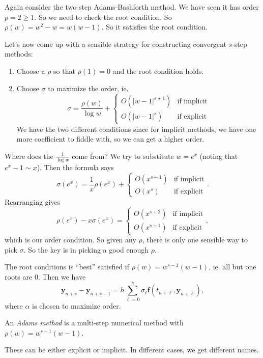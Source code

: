 \documentclass[a4paper]{article}
\begin{document}
\begin{eg}[AB2]
  Again consider the two-step Adams-Bashforth method. We have seen it has order $p = 2 \geq 1$. So we need to check the root condition. So $\rho(w) = w^2 - w = w(w - 1)$. So it satisfies the root condition.
\end{eg}

Let's now come up with a sensible strategy for constructing convergent $s$-step methods:
\begin{enumerate}
  \item Choose a $\rho$ so that $\rho(1) = 0$ and the root condition holds.
  \item Choose $\sigma$ to maximize the order, ie.
    \[
      \sigma = \frac{\rho(w)}{\log w} +
      \begin{cases}
        O(|w - 1|^{s + 1}) & \text{if implicit}\\
        O(|w - 1|^s) & \text{if explicit}
      \end{cases}
    \]
    We have the two different conditions since for implicit methods, we have one more coefficient to fiddle with, so we can get a higher order.
\end{enumerate}
Where does the $\frac{1}{\log w}$ come from? We try to substitute $w = e^x$ (noting that $e^x - 1\sim x$). Then the formula says
\[
  \sigma(e^x) = \frac{1}{x} \rho(e^x) +
  \begin{cases}
    O(x^{s + 1}) & \text{if implicit}\\
    O(x^s) & \text{if explicit}
  \end{cases}.
\]
Rearranging gives
\[
  \rho(e^x) -x \sigma (e^x) =
  \begin{cases}
    O(x^{s + 2}) & \text{if implicit}\\
    O(x^{s + 1}) & \text{if explicit}
  \end{cases},
\]
which is our order condition. So given any $\rho$, there is only one sensible way to pick $\sigma$. So the key is in picking a good enough $\rho$.

The root conditions is ``best'' satisfied if $\rho(w) = w^{s - 1}(w - 1)$, ie. all but one roots are $0$. Then we have
\[
  \mathbf{y}_{n + s} - \mathbf{y}_{n + s - 1} = h \sum_{\ell = 0}^s \sigma_\ell \mathbf{f}(t_{n + \ell}, \mathbf{y}_{n + \ell}),
\]
where $\alpha$ is chosen to maximize order.

\begin{defi}
  An \emph{Adams method} is a multi-step numerical method with $\rho(w) = w^{s - 1}(w - 1)$.
\end{defi}
These can be either explicit or implicit. In different cases, we get different names.
\end{document}
